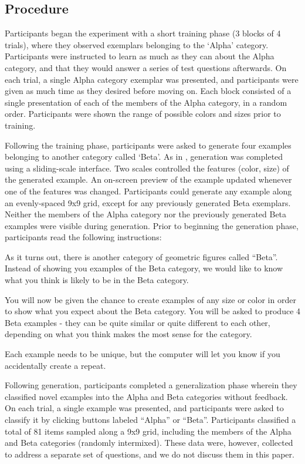 \documentclass[12pt]{article}
\begin{document}
\begin{flushleft}
\subsection{Procedure}

Participants began the experiment with a short training phase (3 blocks of 4 trials), where they observed exemplars belonging to the `Alpha' category. Participants were instructed to learn as much as they can about the Alpha category, and that they would answer a series of test questions afterwards. On each trial, a single Alpha category exemplar was presented, and participants were given as much time as they desired before moving on. Each block consisted of a single presentation of each of the members of the Alpha category, in a random order. Participants were shown the range of possible colors and sizes prior to training.

Following the training phase, participants were asked to generate four examples belonging to another category called `Beta'. As in \citet{jern2013probabilistic}, generation was completed using a sliding-scale interface. Two scales controlled the features (color, size) of the generated example. An on-screen preview of the example updated whenever one of the features was changed. Participants could generate any example along an evenly-spaced 9x9 grid, except for any previously generated Beta exemplars. Neither the members of the Alpha category nor the previously generated Beta examples were visible during generation. Prior to beginning the generation phase, participants read the following instructions:

\begin{displayquote}
As it turns out, there is another category of geometric figures called ``Beta''. Instead of showing you examples of the Beta category, we would like to know what you think is likely to be in the Beta category. 

You will now be given the chance to create examples of any size or color in order to show what you expect about the Beta category. You will be asked to produce 4 Beta examples - they can be quite similar or quite different to each other, depending on what you think makes the most sense for the category.

Each example needs to be unique, but the computer will let you know if you accidentally create a repeat.
\end{displayquote}

Following generation, participants completed a generalization phase wherein they classified novel examples into the Alpha and Beta categories without feedback. On each trial, a single example was presented, and participants were asked to classify it by clicking buttons labeled ``Alpha'' or ``Beta''. Participants classified a total of 81 items sampled along a 9x9 grid, including the members of the Alpha and Beta categories (randomly intermixed). These data were, however, collected to address a separate set of questions, and we do not discuss them in this paper.





\end{flushleft}
\end{document}
